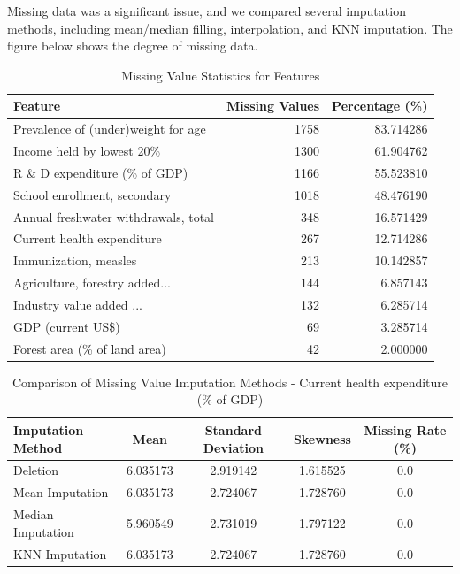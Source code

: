 \documentclass{article}
\begin{document}
Missing data was a significant issue, and we compared several imputation methods, including mean/median filling, interpolation, 
and KNN imputation.
The figure below shows the degree of missing data. 
\begin{table}[h]
    \centering
    \caption{Missing Value Statistics for Features}
    \label{tab:missing_values}
    \begin{tabularx}{\columnwidth}{|>{\raggedright\arraybackslash}X|r|r|} %
        \hline
        \textbf{Feature} & \textbf{Missing Values} & \textbf{Percentage (\%)} \\
        \hline
        Prevalence of (under)weight for age & 1758 & 83.714286 \\
        Income held by lowest 20\% & 1300 & 61.904762 \\
        R \& D expenditure (\% of GDP) & 1166 & 55.523810 \\
        School enrollment, secondary  & 1018 & 48.476190 \\
        Annual freshwater withdrawals, total  & 348 & 16.571429 \\
        Current health expenditure  & 267 & 12.714286 \\
        Immunization, measles  & 213 & 10.142857 \\
        Agriculture, forestry added... & 144 & 6.857143 \\
        Industry value added ... & 132 & 6.285714 \\
        GDP (current US\$) & 69 & 3.285714 \\
        Forest area (\% of land area) & 42 & 2.000000 \\
        \hline
    \end{tabularx} %
\end{table}

\begin{table}[h]
    \centering
    \caption{Comparison of Missing Value Imputation Methods - Current health expenditure (\% of GDP)}
    \label{tab:imputation_comparison_health_exp}
    \begin{tabular}{|l|c|c|c|c|}
        \hline
        \textbf{Imputation Method} & \textbf{Mean} & \textbf{Standard Deviation} & \textbf{Skewness} & \textbf{Missing Rate (\%)} \\
        \hline
        Deletion & 6.035173 & 2.919142 & 1.615525 & 0.0 \\
        Mean Imputation & 6.035173 & 2.724067 & 1.728760 & 0.0 \\
        Median Imputation & 5.960549 & 2.731019 & 1.797122 & 0.0 \\
        KNN Imputation & 6.035173 & 2.724067 & 1.728760 & 0.0 \\
        \hline
    \end{tabular}
\end{table}
\end{document}
